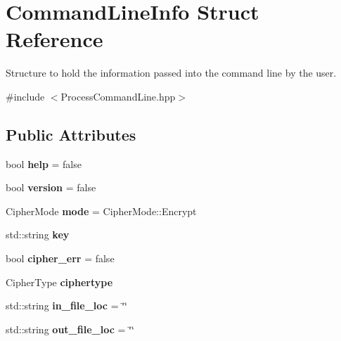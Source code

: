 \hypertarget{struct_command_line_info}{\section{Command\-Line\-Info Struct Reference}
\label{struct_command_line_info}
}


Structure to hold the information passed into the command line by the user.  




{\ttfamily \#include $<$Process\-Command\-Line.\-hpp$>$}

\subsection*{Public Attributes}
\begin{DoxyCompactItemize}
\item 
\hypertarget{struct_command_line_info_ae5ba531705e89ae76a7346cbda8b4122}{bool {\bfseries help} = false}\label{struct_command_line_info_ae5ba531705e89ae76a7346cbda8b4122}

\item 
\hypertarget{struct_command_line_info_aa316bde21b3cc0e492a39d9cc8df918d}{bool {\bfseries version} = false}\label{struct_command_line_info_aa316bde21b3cc0e492a39d9cc8df918d}

\item 
\hypertarget{struct_command_line_info_ae50662480a9c2024db2475d9b74803a1}{Cipher\-Mode {\bfseries mode} = Cipher\-Mode\-::\-Encrypt}\label{struct_command_line_info_ae50662480a9c2024db2475d9b74803a1}

\item 
\hypertarget{struct_command_line_info_a33919bb28c7989eb80b6f5cff951ccd6}{std\-::string {\bfseries key}}\label{struct_command_line_info_a33919bb28c7989eb80b6f5cff951ccd6}

\item 
\hypertarget{struct_command_line_info_a26a4f338c4eef3d28708c589c4dcde57}{bool {\bfseries cipher\-\_\-err} = false}\label{struct_command_line_info_a26a4f338c4eef3d28708c589c4dcde57}

\item 
\hypertarget{struct_command_line_info_a3a669237126f9f2aaa1b360c80590164}{Cipher\-Type {\bfseries ciphertype}}\label{struct_command_line_info_a3a669237126f9f2aaa1b360c80590164}

\item 
\hypertarget{struct_command_line_info_aaa05222a62fbdcbf28bba04b0e973fb5}{std\-::string {\bfseries in\-\_\-file\-\_\-loc} = \char`\"{}\char`\"{}}\label{struct_command_line_info_aaa05222a62fbdcbf28bba04b0e973fb5}

\item 
\hypertarget{struct_command_line_info_a8c3888edf38e5b7e51bc5e3b3e13a07d}{std\-::string {\bfseries out\-\_\-file\-\_\-loc} = \char`\"{}\char`\"{}}\label{struct_command_line_info_a8c3888edf38e5b7e51bc5e3b3e13a07d}

\end{DoxyCompactItemize}


